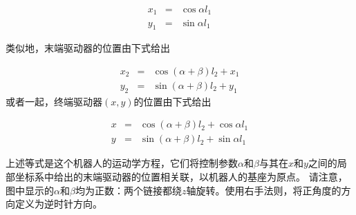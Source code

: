 \begin{eqnarray}\label{eq:cosxl1}
x_1 &=&\cos \alpha l_1\\
y_1 &=&\sin \alpha l_1
\end{eqnarray}

类似地，末端驱动器的位置由下式给出

\begin{eqnarray}
x_2&=&\cos(\alpha+\beta)l_2+x_1\\
y_2&=&\sin(\alpha+\beta)l_2+y_1
\end{eqnarray}
%
或者一起，终端驱动器$(x, y)$的位置由下式给出

\begin{eqnarray}\label{eq:cosx}
x&=&\cos(\alpha+\beta)l_2+\cos\alpha l_1\\
y&=&\sin(\alpha+\beta)l_2+\sin\alpha l_1
\end{eqnarray}


上述等式是这个机器人的运动学方程，它们将控制参数$\alpha$和$\beta$与其在$x$和$y$之间的局部坐标系中给出的末端驱动器的位置相关联，以机器人的基座为原点。 请注意，图中显示的$ \alpha $和$ \beta $均为正数：两个链接都绕$z$轴旋转。使用右手法则，将正角度的方向定义为逆时针方向。


